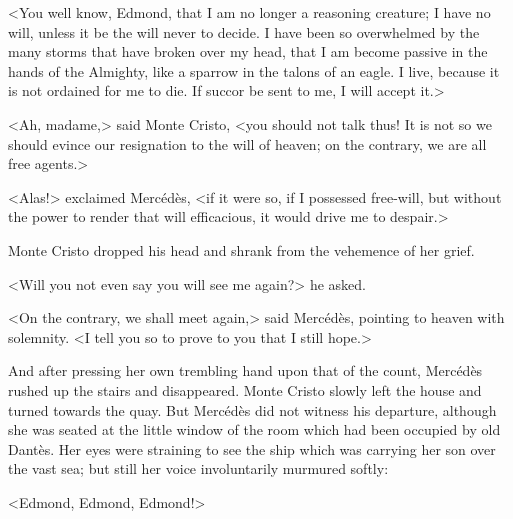  <You well know, Edmond, that I am no longer a reasoning creature; I have no will, unless it be the will never to decide. I have been so overwhelmed by the many storms that have broken over my head, that I am become passive in the hands of the Almighty, like a sparrow in the talons of an eagle. I live, because it is not ordained for me to die. If succor be sent to me, I will accept it.> 

 <Ah, madame,> said Monte Cristo, <you should not talk thus! It is not so we should evince our resignation to the will of heaven; on the contrary, we are all free agents.> 

 <Alas!> exclaimed Mercédès, <if it were so, if I possessed free-will, but without the power to render that will efficacious, it would drive me to despair.> 

 Monte Cristo dropped his head and shrank from the vehemence of her grief. 

 <Will you not even say you will see me again?> he asked. 

 <On the contrary, we shall meet again,> said Mercédès, pointing to heaven with solemnity. <I tell you so to prove to you that I still hope.> 

 And after pressing her own trembling hand upon that of the count, Mercédès rushed up the stairs and disappeared. Monte Cristo slowly left the house and turned towards the quay. But Mercédès did not witness his departure, although she was seated at the little window of the room which had been occupied by old Dantès. Her eyes were straining to see the ship which was carrying her son over the vast sea; but still her voice involuntarily murmured softly: 

 <Edmond, Edmond, Edmond!> 